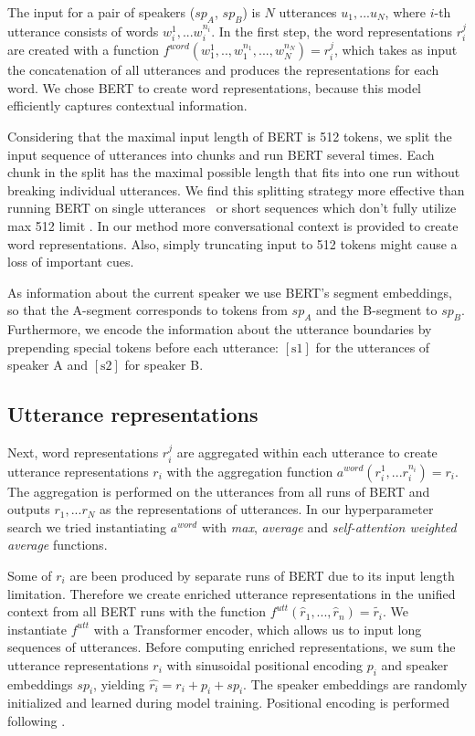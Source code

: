 The input for a pair of speakers ($sp_A$, $sp_B$) is $N$ utterances $u_1, ... u_N$, where $i$-th utterance consists of words $w_i^1, ... w_i^{n_i}$. 
In the first step, the word representations $r_i^j$ are created with a function $f^{word}(w_1^1,..,w_1^{n_1},...,w_N^{n_N})=r_i^j$, which takes as input the concatenation of all utterances and produces the representations for each word. We chose BERT \cite{devlin2019bert} to create word representations, because this model efficiently captures contextual information.

Considering that the maximal input length of BERT is 512 tokens, we split the input sequence of utterances into chunks and run BERT several times. Each chunk in the split has the maximal possible length that fits into one run without breaking individual utterances. We find this splitting strategy more effective than running BERT on single utterances~\cite{chen2020mpdd} or short sequences which don't fully utilize max 512 limit \cite{jia2020ddrel}. In our method more conversational context is provided to create word representations. Also, simply truncating input to 512 tokens \cite{lu2020improving} might cause a loss of important cues. 

As information about the current speaker we use BERT's segment embeddings, so that the A-segment corresponds to tokens from $sp_A$ and the B-segment to $sp_B$.
Furthermore, we encode the information about the utterance boundaries by prepending special tokens before each utterance: $[\textrm{s1}]$ for the utterances of speaker A and $[\textrm{s2}]$ for speaker B. 

\subsection{Utterance representations}

Next, word representations $r_i^j$ are aggregated within each utterance to create utterance representations $r_i$ with the aggregation function $a^{word}(r_i^1,...r_i^{n_i})=r_i$. The aggregation is performed on the utterances from all runs of BERT and outputs $r_1, ... r_N$ as the representations of utterances.
In our hyperparameter search we tried instantiating $a^{word}$ with \textit{max}, \textit{average} and \textit{self-attention weighted average} functions.

Some of $r_i$ are been produced by separate runs of BERT due to its input length limitation. Therefore we create enriched utterance representations in the unified context from all BERT runs with the function $f^{utt}(\hat{r}_1,...,\hat{r}_n) = \tilde{r_i}$. We instantiate $f^{utt}$ with a Transformer encoder, which allows us to input long sequences of utterances. 
Before computing enriched representations, we sum the utterance representations $r_i$ with sinusoidal positional encoding $p_i$ and speaker embeddings $sp_i$, yielding $\hat{r_i} = r_i + p_i + sp_i$. The speaker embeddings are randomly initialized and learned during model training. Positional encoding is performed following \citet{vaswani2017attention}. 

